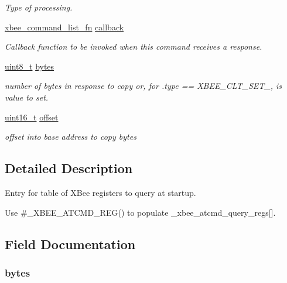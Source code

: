 \begin{DoxyCompactItemize}
\begin{DoxyCompactList}\small\item\em Type of processing. \end{DoxyCompactList}\item 
\hyperlink{group__xbee__atcmd_ga0d223ca5aacf39a0469f444fae5d1503}{xbee\-\_\-command\-\_\-list\-\_\-fn} \hyperlink{structxbee__atcmd__reg__t_a2611714f3f3d031a2c5f8202f2544567}{callback}
\begin{DoxyCompactList}\small\item\em Callback function to be invoked when this command receives a response. \end{DoxyCompactList}\item 
\hyperlink{group__hal_gae1affc9ca37cfb624959c866a73f83c2}{uint8\-\_\-t} \hyperlink{structxbee__atcmd__reg__t_a6b05ea38740bd6a3d857c312ef67e40e}{bytes}
\begin{DoxyCompactList}\small\item\em number of bytes in response to copy or, for .type == X\-B\-E\-E\-\_\-\-C\-L\-T\-\_\-\-S\-E\-T\-\_, is value to set. \end{DoxyCompactList}\item 
\hypertarget{structxbee__atcmd__reg__t_ac681806181c80437cfab37335f62ff39}{\hyperlink{group__hal_ga5a8b2dc9e45a9ee81a94ef304fb62505}{uint16\-\_\-t} \hyperlink{structxbee__atcmd__reg__t_ac681806181c80437cfab37335f62ff39}{offset}}\label{structxbee__atcmd__reg__t_ac681806181c80437cfab37335f62ff39}

\begin{DoxyCompactList}\small\item\em offset into base address to copy bytes \end{DoxyCompactList}\end{DoxyCompactItemize}


\subsection{Detailed Description}
Entry for table of X\-Bee registers to query at startup. 

Use \#\-\_\-\-X\-B\-E\-E\-\_\-\-A\-T\-C\-M\-D\-\_\-\-R\-E\-G() to populate \-\_\-xbee\-\_\-atcmd\-\_\-query\-\_\-regs\mbox{[}\mbox{]}. 

\subsection{Field Documentation}
\hypertarget{structxbee__atcmd__reg__t_a6b05ea38740bd6a3d857c312ef67e40e}{
\subsubsection[{bytes}]{ bytes}}\label{structxbee__atcmd__reg__t_a6b05ea38740bd6a3d857c312ef67e40e}


